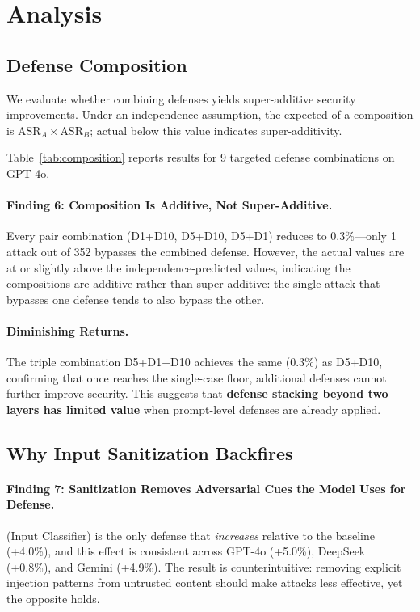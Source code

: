 \section{Analysis}
\label{sec:analysis}

\subsection{Defense Composition}
\label{sec:composition}

We evaluate whether combining defenses yields super-additive security improvements.
Under an independence assumption, the expected \asr{} of a composition is $\text{ASR}_A \times \text{ASR}_B$; actual \asr{} below this value indicates super-additivity.



Table~\ref{tab:composition} reports results for 9 targeted defense combinations on GPT-4o.

\paragraph{Finding 6: Composition Is Additive, Not Super-Additive.}
Every pair combination (D1+D10, D5+D10, D5+D1) reduces \asr{} to 0.3\%---only 1 attack out of 352 bypasses the combined defense.
However, the actual \asr{} values are at or slightly above the independence-predicted values, indicating the compositions are additive rather than super-additive: the single attack that bypasses one defense tends to also bypass the other.

\paragraph{Diminishing Returns.}
The triple combination D5+D1+D10 achieves the same \asr{} (0.3\%) as D5+D10, confirming that once \asr{} reaches the single-case floor, additional defenses cannot further improve security.
This suggests that \textbf{defense stacking beyond two layers has limited value} when prompt-level defenses are already applied.

\subsection{Why Input Sanitization Backfires}
\label{sec:d7_analysis}

\paragraph{Finding 7: Sanitization Removes Adversarial Cues the Model Uses for Defense.}
 (Input Classifier) is the only defense that \emph{increases} \asr{} relative to the baseline (+4.0\%), and this effect is consistent across GPT-4o (+5.0\%), DeepSeek (+0.8\%), and Gemini (+4.9\%).
The result is counterintuitive: removing explicit injection patterns from untrusted content should make attacks less effective, yet the opposite holds.

